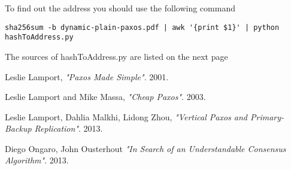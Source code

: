 \documentclass[12pt]{article}
\begin{document}
To find out the address you should use the following command

\lstset{
  language=bash,
  frame=tb,
  breaklines=true,
  columns=fullflexible,
  basicstyle = \ttfamily
}
\begin{lstlisting}
sha256sum -b dynamic-plain-paxos.pdf | awk '{print $1}' | python hashToAddress.py
\end{lstlisting}
The sources of hashToAddress.py are listed on the next page

\newpage

\lstset{
  language=Python,
  frame=tb,
  breaklines=true,
  columns=fullflexible,
  basicstyle = \ttfamily
}


\newpage

\begin{thebibliography}{9}

  Leslie Lamport,
  \emph{"Paxos Made Simple"}.
  2001.

  Leslie Lamport and Mike Massa,
  \emph{"Cheap Paxos"}.
  2003.

  Leslie Lamport, Dahlia Malkhi, Lidong Zhou,
  \emph{"Vertical Paxos and Primary-Backup Replication"}.
  2013.

  Diego Ongaro, John Ousterhout
  \emph{"In Search of an Understandable Consensus Algorithm"}.
  2013.

\end{thebibliography}
\end{document}
